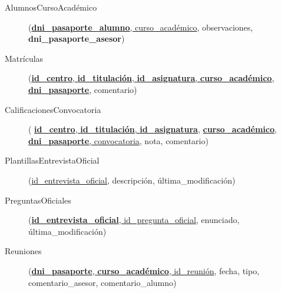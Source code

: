   \begin{description}
    \item[AlumnosCursoAcadémico] \begin{flushleft}(\underline{\textbf{dni\_pasaporte\_alumno},
    curso\_académico}, observaciones, \textbf{dni\_pasaporte\_asesor})\end{flushleft}
  \end{description}

  \begin{description}
    \item[Matrículas] \begin{flushleft}(\underline{\textbf{id\_centro},
    \textbf{id\_titulación}, \textbf{id\_asignatura},
    \textbf{curso\_académico},} \underline{\textbf{dni\_pasaporte}},
     comentario)\end{flushleft}
  \end{description}

  \begin{description}
    \item[CalificacionesConvocatoria] \begin{flushleft}(
    \underline{\textbf{id\_centro}, \textbf{id\_titulación},
    \textbf{id\_asignatura},} \underline{\textbf{curso\_académico},
    \textbf{dni\_pasaporte}, convocatoria}, nota, comentario)\end{flushleft}
  \end{description}

  \begin{description}
    \item[PlantillasEntrevistaOficial] \begin{flushleft}(\underline{id\_entrevista\_oficial}, descripción,
    última\_modificación)\end{flushleft}
  \end{description}

  \begin{description}
    \item[PreguntasOficiales] \begin{flushleft}(\underline{\textbf{id\_entrevista\_oficial},
    id\_pregunta\_oficial}, enunciado, última\_modificación)\end{flushleft}
  \end{description}

  \begin{description}
    \item[Reuniones] \begin{flushleft}(\underline{\textbf{dni\_pasaporte},
    \textbf{curso\_académico}, id\_reunión}, fecha, tipo,
    comentario\_asesor, comentario\_alumno)\end{flushleft}
  \end{description}

